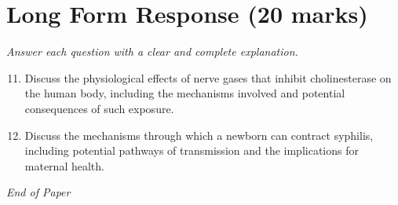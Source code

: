 \documentclass[12pt]{article}
\begin{document}
\section*{Long Form Response (20 marks)}
\textit{Answer each question with a clear and complete explanation.}
\begin{enumerate}[label=\arabic*.]
\setcounter{enumi}{10}
\item Discuss the physiological effects of nerve gases that inhibit cholinesterase on the human body, including the mechanisms involved and potential consequences of such exposure.
\item Discuss the mechanisms through which a newborn can contract syphilis, including potential pathways of transmission and the implications for maternal health.
\end{enumerate}

\vfill
\noindent\textit{End of Paper}
\end{document}
